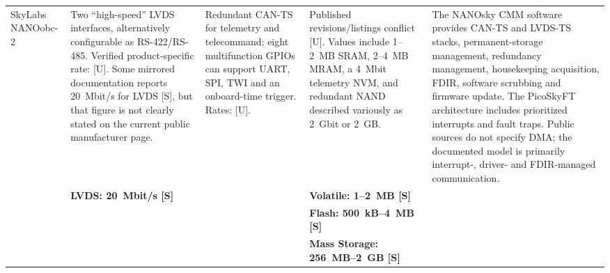 \documentclass[10pt]{../datasheet}
\let\cite\citep
\begin{document}
\begin{landscape}
\begin{longtable}{|p{3.2cm}|p{4.5cm}|p{4.5cm}|p{4.5cm}|p{5.5cm}|}
    SkyLabs NANOobc-2 \cite{skylabs_nanoobc_2_ds}                      &
    Two ``high-speed'' LVDS interfaces, alternatively configurable as
    RS-422/RS-485. Verified product-specific rate: [U]. Some mirrored
    documentation reports 20~Mbit/s for LVDS [S], but that figure is not clearly
    stated on the current public manufacturer page.
                                                                       & Redundant CAN-TS for telemetry and telecommand; eight multifunction GPIOs
    can support UART, SPI, TWI and an onboard-time trigger. Rates: [U].
                                                                       & Published revisions/listings conflict [U]. Values include 1--2~MB SRAM,
    2--4~MB MRAM, a 4~Mbit telemetry NVM, and redundant NAND described variously
    as 2~Gbit or 2~GB.                                                 & The
    NANOsky CMM software provides CAN-TS and LVDS-TS stacks, permanent-storage
    management, redundancy management, housekeeping acquisition, FDIR, software
    scrubbing and firmware update. The PicoSkyFT architecture includes
    prioritized interrupts and fault traps. Public sources do not specify DMA;
    the documented model is primarily interrupt-, driver- and FDIR-managed
    communication.
    \\
    \cline{2-5}
                                                                       & \textbf{LVDS: 20~Mbit/s [S]}
                                                                       &
                                                                       & \textbf{Volatile: 1--2~MB [S]}                                             &                                                                                                \\
                                                                       &                                                                            &                                                  & \textbf{Flash: 500~kB--4~MB [S]}          & \\
                                                                       &                                                                            &                                                  & \textbf{Mass Storage: 256~MB--2~GB [S]}   & \\ \hline\hline


\end{longtable}
\end{landscape}
\end{document}
